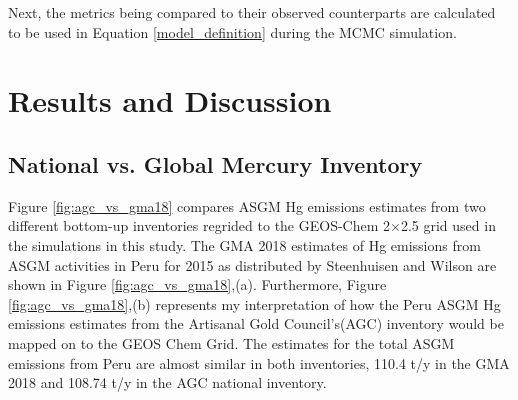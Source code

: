 \begin{flushleft}
Next, the metrics being compared to their observed counterparts are calculated to be used in Equation \ref{model_definition} during the MCMC simulation. 
\end{flushleft}



\newpage
\section{Results and Discussion}
\subsection{National vs. Global Mercury Inventory}
Figure \ref{fig:agc_vs_gma18} compares ASGM Hg emissions estimates from two different bottom-up inventories regrided to the GEOS-Chem 2$\times$2.5 grid used in the simulations in this study. The GMA 2018  estimates of Hg emissions from ASGM activities in Peru for 2015 as distributed by Steenhuisen and Wilson\cite{steenhuisen_development_2019} are shown in Figure \ref{fig:agc_vs_gma18},(a). Furthermore, Figure \ref{fig:agc_vs_gma18},(b) represents my interpretation of how the Peru ASGM Hg emissions estimates from the Artisanal Gold Council's(AGC) inventory\cite{agc_reporte_2017} would be mapped on to the GEOS Chem Grid. The estimates for the total ASGM emissions from Peru are almost similar in both inventories, 110.4 t/y in the GMA 2018 and 108.74 t/y in the AGC national inventory.





